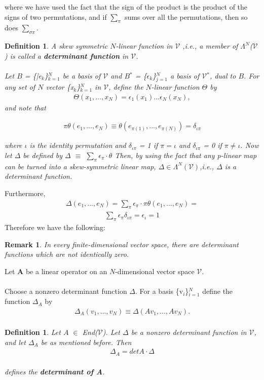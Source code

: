 \documentclass[12pt,a4paper]{article}
\newtheorem{remark}[thm]{Remark}
\newtheorem{defn}[thm]{Definition}
\begin{document}
where we have used the fact that the sign of the product is the product of the
signs of two permutations, and if $\sum_\pi$ sums over all the permutations, then so does $\sum_{\sigma \pi}$.
\begin{defn}
A skew symmetric $N$-linear function in $\mathcal{V}$ ,i.e., a member of $\Lambda^N$($\mathcal{V}$) is called a \textbf{determinant function} in $\mathcal{V}$.\\\\
Let $B$ = \{|e$_k$\}$^{N}_{k=1}$ be a basis of $\mathcal{V}$ and $B$$^*$ = \{$\epsilon_k$\}$^N_{j=1}$ a basis of $\mathcal{V}$$^*$, dual to $B$. For any set of $N$ vector \{x$_k$\}$^N_{k=1}$ in $\mathcal{V}$, define the $N$-linear function $\Theta$ by 
\begin{align*}
	\Theta(x_1,...,x_N) = \epsilon_1(x_1)...\epsilon_N(x_N),
\end{align*}
and note that 

\begin{align*}
\pi \theta(e_1, ... , e_N) \equiv \theta(e_{\pi(1)}, ... , e_{\pi(N)}) = \delta_{\iota \pi}
\end{align*}

where $\iota$ is the identity permutation and $\delta_{\iota \pi}$ = 1 if $\pi = \iota$ and $\delta_{\iota \pi}$ = 0 if $\pi \ne \iota$.
Now let $\Delta$ be defined by $\Delta$ $\equiv$ $\sum_{\pi}\epsilon_{\pi} \cdot \theta$ Then, by using the fact that any p-linear map can be turned into a skew-symmetric linear map, $\Delta \in \Lambda^N(\mathcal{V})$,i.e., $\Delta$ is a determinant function.
\end{defn}
Furthermore,
\begin{align*}
\Delta( e_1, ... , e_N) = \sum_\pi \epsilon_\pi \cdot \pi \theta (e_1, ... , e_N) =
\end{align*}
\begin{align*}
\sum_\pi \epsilon_\pi \delta_{\iota \pi} = \epsilon_\iota = 1
\end{align*}
Therefore we have the following:
\begin{remark}
In every finite-dimensional vector space, there are determinant functions which are not identically zero.
\end{remark}
Let \textbf{A} be a linear operator on an $N$-dimensional vector space $\mathcal{V}$. \\ \\Choose a nonzero determinant function $\Delta$. For a basis \{v$_i$\}$^{N}_{i=1}$ define the function $\Delta_A$ by \\ 
\begin{align*}
\Delta_A(v_1,...,v_N) \equiv \Delta(Av_1,...,Av_N). \\
\end{align*}
\begin{defn}
Let $A$ $\in$ End($\mathcal{V}$). Let $\Delta$ be a nonzero determinant function in $\mathcal{V}$, and let $\Delta_A$ be as mentioned before. Then
 \begin{align*}
\Delta_A = det A\cdot \Delta
\end{align*}
\\
defines the \textbf{determinant of A}.\end{defn}
\newpage
\end{document}
